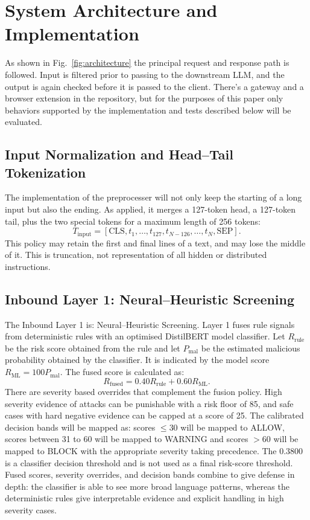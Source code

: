 \documentclass[conference]{IEEEtran}
\begin{document}
\section{System Architecture and Implementation}
As shown in Fig.~\ref{fig:architecture} the principal request and response path is followed. Input is filtered prior to passing to the downstream LLM, and the output is again checked before it is passed to the client. There's a gateway and a browser extension in the repository, but for the purposes of this paper only behaviors supported by the implementation and tests described below will be evaluated.

\subsection{Input Normalization and Head--Tail Tokenization}
The implementation of the preprocesser will not only keep the starting of a long input but also the ending. As applied, it merges a 127-token head, a 127-token tail, plus the two special tokens for a maximum length of 256 tokens:
\begin{equation}
T_{\text{input}} = [\text{CLS}, t_1, \dots, t_{127}, t_{N-126}, \dots, t_N, \text{SEP}].
\end{equation}
This policy may retain the first and final lines of a text, and may lose the middle of it. This is truncation, not representation of all hidden or distributed instructions.

\subsection{Inbound Layer 1: Neural--Heuristic Screening}
The Inbound Layer 1 is: Neural--Heuristic Screening. Layer 1 fuses rule signals from deterministic rules with an optimised DistilBERT model classifier. Let $R_{\text{rule}}$ be the risk score obtained from the rule and let $P_{\text{mal}}$ be the estimated malicious probability obtained by the classifier. It is indicated by the model score $R_{\text{ML}} = 100 P_{\text{mal}}$. The fused score is calculated as:
\begin{equation}
R_{\text{fused}} = 0.40 R_{\text{rule}} + 0.60 R_{\text{ML}}.
\end{equation}
There are severity based overrides that complement the fusion policy. High severity evidence of attacks can be punishable with a risk floor of 85, and safe cases with hard negative evidence can be capped at a score of 25. The calibrated decision bands will be mapped as: scores $\le 30$ will be mapped to ALLOW, scores between 31 to 60 will be mapped to WARNING and scores $> 60$ will be mapped to BLOCK with the appropriate severity taking precedence. The 0.3800 is a classifier decision threshold and is not used as a final risk-score threshold. Fused scores, severity overrides, and decision bands combine to give defense in depth: the classifier is able to see more broad language patterns, whereas the deterministic rules give interpretable evidence and explicit handling in high severity cases.
\end{document}
